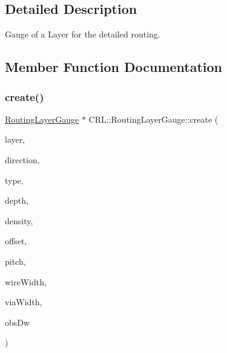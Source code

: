 \subsection{Detailed Description}
Gauge of a Layer for the detailed routing. 

\subsection{Member Function Documentation}
\mbox{\label{classCRL_1_1RoutingLayerGauge_afe17db013bf6a933c2af4e847bfd7918}} 
\subsubsection{\texorpdfstring{create()}{create()}}
{\footnotesize\ttfamily \hyperlink{classCRL_1_1RoutingLayerGauge}{Routing\+Layer\+Gauge} $\ast$ C\+R\+L\+::\+Routing\+Layer\+Gauge\+::create (\begin{DoxyParamCaption}\item[{const \textbf{ Layer} $\ast$}]{layer,  }\item[{\hyperlink{namespaceConstant_ac081a99f2b64361919ed5d9f37c0f9af}{Constant\+::\+Direction}}]{direction,  }\item[{\hyperlink{namespaceConstant_ab2e46a17cc373a268c5c24fa0e2067e5}{Constant\+::\+Layer\+Gauge\+Type}}]{type,  }\item[{unsigned int}]{depth,  }\item[{double}]{density,  }\item[{\textbf{ Db\+U\+::\+Unit}}]{offset,  }\item[{\textbf{ Db\+U\+::\+Unit}}]{pitch,  }\item[{\textbf{ Db\+U\+::\+Unit}}]{wire\+Width,  }\item[{\textbf{ Db\+U\+::\+Unit}}]{via\+Width,  }\item[{\textbf{ Db\+U\+::\+Unit}}]{obs\+Dw }\end{DoxyParamCaption})\hspace{0.3cm}{\ttfamily [static]}}


